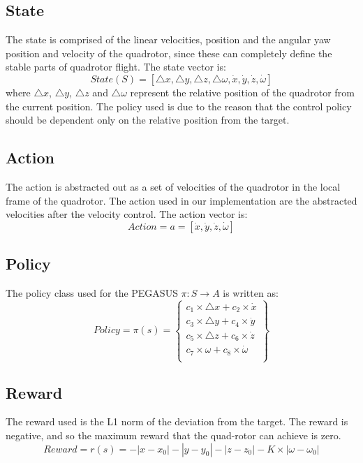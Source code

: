 \documentclass[hidelinks,BTech]{iitmdiss}
\begin{document}
\subsection*{State}
The state is comprised of the linear velocities, position and the angular yaw position and velocity of the quadrotor, since these can completely define the stable parts of quadrotor flight. 
The state vector is:
\begin{equation}
  State(S) = [\triangle{x}, \triangle{y}, \triangle{z}, \triangle{\omega}, \dot{x}, \dot{y}, \dot{z}, \dot{\omega}]
\end{equation}
where $\triangle{x}$, $\triangle{y}$, $\triangle{z}$ and $\triangle{\omega}$ represent the relative position of the quadrotor from the current position. The policy used is due to the reason that the control policy should be dependent only on the relative position from the target.  

\subsection*{Action} The action is abstracted out as a set of velocities of the quadrotor in the local frame of the quadrotor. The action used in our implementation are the abstracted velocities after the velocity control. The action vector is:
\begin{equation}
  Action = a = [\dot{x}, \dot{y}, \dot{z}, \dot{\omega}]
\end{equation}

\subsection*{Policy}
The policy class used for the PEGASUS $\pi: S \rightarrow A$ is written as:
\begin{equation}
  Policy = \pi(s) = \left\{
    \begin{array}{c}
      c_1 \times \triangle{x} + c_2 \times \dot{x} \\
      c_3 \times \triangle{y} + c_4 \times \dot{y} \\
      c_5 \times \triangle{z} + c_6 \times \dot{z} \\
      c_7 \times \omega + c_8 \times \dot{\omega} \\
    \end{array}
  \right\}
\end{equation}

\subsection*{Reward}
The reward used is the L1 norm of the deviation from the target. The reward is negative, and so the maximum reward that the quad-rotor can achieve is zero. 
\begin{equation}
  Reward = r(s) = - |x - x_0| - |y - y_0| - |z - z_0| - K \times |\omega - \omega_0|
\end{equation}
\end{document}
